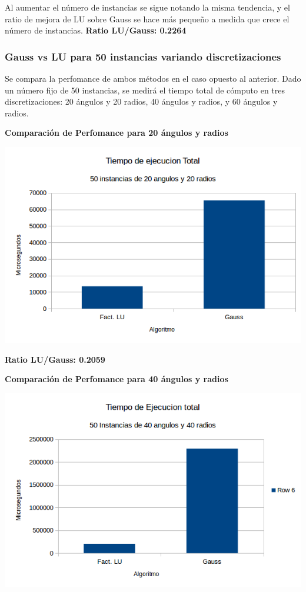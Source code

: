 Al aumentar el n\'umero de instancias se sigue notando la misma tendencia, y el ratio de mejora de LU sobre Gauss se hace m\'as pequeño a medida que crece el n\'umero de instancias. \textbf{Ratio LU/Gauss: 0.2264}

\subsubsection{Gauss vs LU para 50 instancias variando discretizaciones}

Se compara la perfomance de ambos m\'etodos en el caso opuesto al anterior. Dado un n\'umero fijo de 50 instancias, se medir\'a el tiempo total de c\'omputo en tres discretizaciones: 20 \'angulos y 20 radios, 40 \'angulos y radios, y 60 \'angulos y radios. 

  	\textbf{Comparaci\'on de Perfomance para 20 \'angulos y radios }\\
\begin{center}
\includegraphics[scale=0.7]{experimentos2a_2b/2b2020.png}
\end{center}

 \textbf{Ratio LU/Gauss: 0.2059}

  	\textbf{Comparaci\'on de Perfomance para 40 \'angulos y radios }\\
\begin{center}
\includegraphics[scale=0.7]{experimentos2a_2b/2b4040.png}
\end{center}

